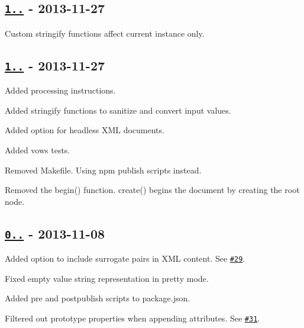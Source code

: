 \subsection*{\href{https://github.com/oozcitak/xmlbuilder-js/compare/v1.0.0...v1.0.1}{\tt 1..} -\/ 2013-\/11-\/27}


\begin{DoxyItemize}
\item Custom stringify functions affect current instance only.
\end{DoxyItemize}

\subsection*{\href{https://github.com/oozcitak/xmlbuilder-js/compare/v0.4.3...v1.0.0}{\tt 1..} -\/ 2013-\/11-\/27}


\begin{DoxyItemize}
\item Added processing instructions.
\item Added stringify functions to sanitize and convert input values.
\item Added option for headless X\+ML documents.
\item Added vows tests.
\item Removed Makefile. Using npm publish scripts instead.
\item Removed the {\ttfamily begin()} function. {\ttfamily create()} begins the document by creating the root node.
\end{DoxyItemize}

\subsection*{\href{https://github.com/oozcitak/xmlbuilder-js/compare/v0.4.2...v0.4.3}{\tt 0..} -\/ 2013-\/11-\/08}


\begin{DoxyItemize}
\item Added option to include surrogate pairs in X\+ML content. See \href{https://github.com/oozcitak/xmlbuilder-js/issues/29}{\tt \#29}.
\item Fixed empty value string representation in pretty mode.
\item Added pre and postpublish scripts to package.\+json.
\item Filtered out prototype properties when appending attributes. See \href{https://github.com/oozcitak/xmlbuilder-js/issues/31}{\tt \#31}.
\end{DoxyItemize}


